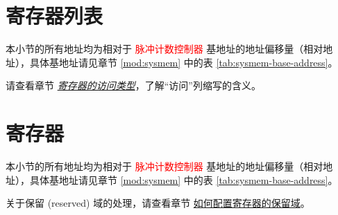 \documentclass[main\_\_CN.tex]{subfiles}
\begin{document}



\newpage
\hypertarget{pcnt-reg-summ}{}
\section{寄存器列表}
\label{sec:pcnt-reg-summ}


本小节的所有地址均为相对于 \textcolor{red}{脉冲计数控制器} 基地址的地址偏移量（相对地址），具体基地址请见章节 \ref{mod:sysmem} \textit{} 中的表 \ref{tab:sysmem-base-address}。

请查看章节 \hyperref[glossary-access-types]{\textit{寄存器的访问类型}}，了解“访问”列缩写的含义。






\newpage
\section{寄存器}

本小节的所有地址均为相对于 \textcolor{red}{脉冲计数控制器} 基地址的地址偏移量（相对地址），具体基地址请见章节 \ref{mod:sysmem} \textit{} 中的表 \ref{tab:sysmem-base-address}。

关于保留 (reserved) 域的处理，请查看章节 \hyperref[programming-reserved-field]{如何配置寄存器的保留域}。


\end{document}
